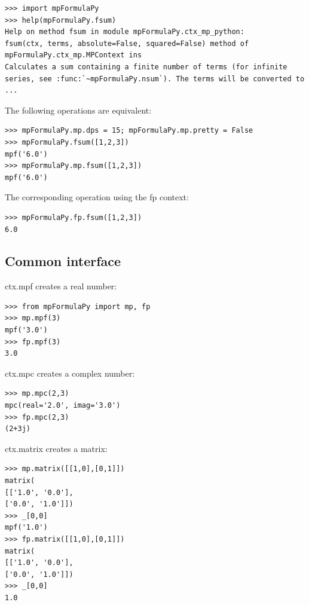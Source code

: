\begin{lstlisting}
>>> import mpFormulaPy
>>> help(mpFormulaPy.fsum)
Help on method fsum in module mpFormulaPy.ctx_mp_python:
fsum(ctx, terms, absolute=False, squared=False) method of mpFormulaPy.ctx_mp.MPContext ins
Calculates a sum containing a finite number of terms (for infinite
series, see :func:`~mpFormulaPy.nsum`). The terms will be converted to
...
\end{lstlisting}



The following operations are equivalent:

\begin{lstlisting}
>>> mpFormulaPy.mp.dps = 15; mpFormulaPy.mp.pretty = False
>>> mpFormulaPy.fsum([1,2,3])
mpf('6.0')
>>> mpFormulaPy.mp.fsum([1,2,3])
mpf('6.0')
\end{lstlisting}


The corresponding operation using the fp context:

\begin{lstlisting}
>>> mpFormulaPy.fp.fsum([1,2,3])
6.0
\end{lstlisting}


\subsection{Common interface}  

ctx.mpf creates a real number:

\begin{lstlisting}
>>> from mpFormulaPy import mp, fp
>>> mp.mpf(3)
mpf('3.0')
>>> fp.mpf(3)
3.0
\end{lstlisting}


ctx.mpc creates a complex number:

\begin{lstlisting}
>>> mp.mpc(2,3)
mpc(real='2.0', imag='3.0')
>>> fp.mpc(2,3)
(2+3j)
\end{lstlisting}


ctx.matrix creates a matrix:

\begin{lstlisting}
>>> mp.matrix([[1,0],[0,1]])
matrix(
[['1.0', '0.0'],
['0.0', '1.0']])
>>> _[0,0]
mpf('1.0')
>>> fp.matrix([[1,0],[0,1]])
matrix(
[['1.0', '0.0'],
['0.0', '1.0']])
>>> _[0,0]
1.0
\end{lstlisting}


